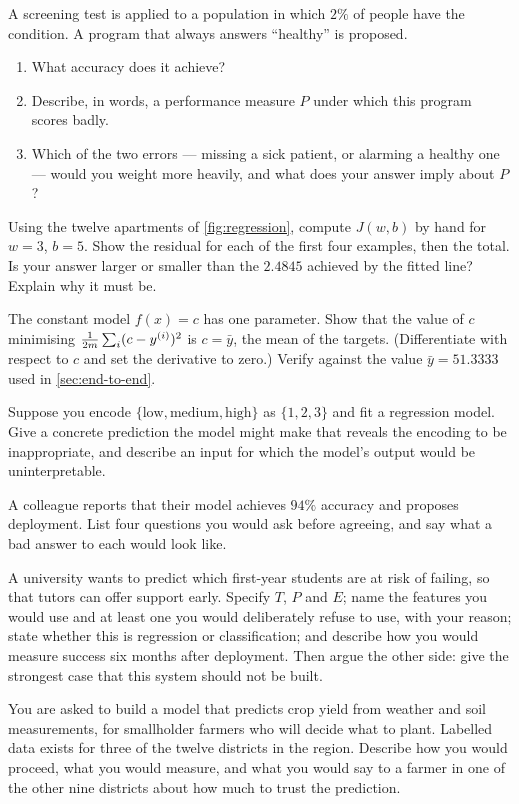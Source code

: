 \ap A screening test is applied to a population in which $2\%$ of people have the
condition. A program that always answers ``healthy'' is proposed.
\begin{enumerate}[label=(\alph*)]
  \item What accuracy does it achieve?
  \item Describe, in words, a performance measure $P$ under which this program
        scores badly.
  \item Which of the two errors --- missing a sick patient, or alarming a healthy
        one --- would you weight more heavily, and what does your answer imply
        about $P$?
\end{enumerate}

\ap Using the twelve apartments of \cref{fig:regression}, compute $J(w,b)$ by
hand for $w = 3$, $b = 5$. Show the residual for each of the first four
examples, then the total. Is your answer larger or smaller than the $2.4845$
achieved by the fitted line? Explain why it must be.

\ap The constant model $f(x)=c$ has one parameter. Show that the value of $c$
minimising $\frac{1}{2m}\sum_i (c - y^{(i)})^2$ is $c = \bar y$, the mean of the
targets. (Differentiate with respect to $c$ and set the derivative to zero.)
Verify against the value $\bar y = 51.3333$ used in \cref{sec:end-to-end}.

\ap Suppose you encode $\{\text{low}, \text{medium}, \text{high}\}$ as
$\{1,2,3\}$ and fit a regression model. Give a concrete prediction the model
might make that reveals the encoding to be inappropriate, and describe an input
for which the model's output would be uninterpretable.

\ap A colleague reports that their model achieves $94\%$ accuracy and proposes
deployment. List four questions you would ask before agreeing, and say what a
bad answer to each would look like.


\dpr A university wants to predict which first-year students are at risk of
failing, so that tutors can offer support early. Specify $T$, $P$ and $E$; name
the features you would use and at least one you would deliberately refuse to use,
with your reason; state whether this is regression or classification; and
describe how you would measure success six months after deployment. Then argue
the other side: give the strongest case that this system should not be built.

\dpr You are asked to build a model that predicts crop yield from weather and
soil measurements, for smallholder farmers who will decide what to plant.
Labelled data exists for three of the twelve districts in the region. Describe
how you would proceed, what you would measure, and what you would say to a farmer
in one of the other nine districts about how much to trust the prediction.

